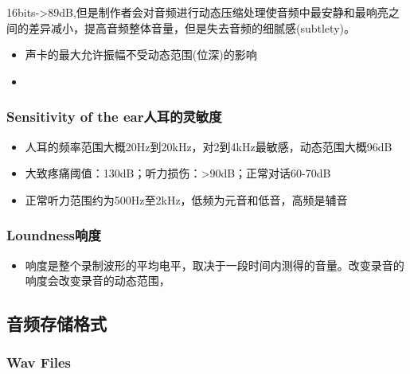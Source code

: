 \documentclass[UTF8]{ctexart}
\begin{document}
16bits->89dB,但是制作者会对音频进行动态压缩处理使音频中最安静和最响亮之间的差异减小，提高音频整体音量，但是失去音频的细腻感(subtlety)。

\begin{itemize}
    \item 声卡的最大允许振幅不受动态范围(位深)的影响
    \item 
\end{itemize}

\subsubsection{Sensitivity of the ear人耳的灵敏度}
\begin{itemize}
    \item 人耳的频率范围大概20Hz到20kHz，对2到4kHz最敏感，动态范围大概96dB
    \item 大致疼痛阈值：130dB；听力损伤：>90dB；正常对话60-70dB
    \item 正常听力范围约为500Hz至2kHz，低频为元音和低音，高频是辅音
\end{itemize}

\subsubsection{Loundness响度}

\begin{itemize}
    \item 响度是整个录制波形的平均电平，取决于一段时间内测得的音量。改变录音的响度会改变录音的动态范围，
\end{itemize}

\subsection{音频存储格式}

\subsubsection{Wav Files}
\end{document}
